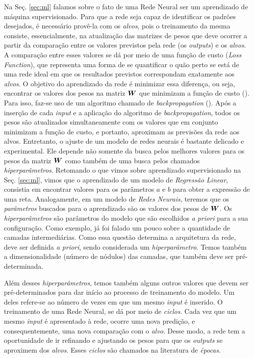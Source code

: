 Na Seç. \ref{sec:ml} falamos sobre o fato de uma Rede Neural ser um aprendizado de máquina supervisionado. Para que a rede seja capaz de identificar os padrões desejados, é necessário provê-la com os \textit{alvos}, pois o treinamento da mesma consiste, essencialmente, na atualização das matrizes de pesos que deve ocorrer a partir da comparação entre os valores previstos pela rede (os \textit{outputs}) e os \textit{alvos}. A comparação entre esses valores se dá por meio de uma função de custo (\textit{Loss Function}), que representa uma forma de se quantificar o quão perto se está de uma rede ideal em que os resultados previstos correspondam exatamente aos \textit{alvos}. O objetivo do aprendizado da rede é minimizar essa diferença, ou seja, encontrar os valores dos pesos na matriz $\bm{W}$ que minimizam a função de custo (\cite{josh:2017}). Para isso, faz-se uso de um algoritmo chamado de \textit{backpropagation} (\cite{Goodfellow-et-al-2016}). Após a inserção de cada \textit{input} e a aplicação do algoritmo de \textit{backpropagation}, todos os pesos são atualizados simultaneamente com os valores que em conjunto minimizam a função de custo, e portanto, aproximam as previsões da rede aos alvos. Entretanto, o ajuste de um modelo de redes neurais é bastante delicado e experimental. Ele depende não somente da busca pelos melhores valores para os pesos da matriz $\bm{W}$ como também de uma busca pelos chamados \textit{hiperparâmetros}. Retomando o que vimos sobre aprendizado supervisionado na Seç. \ref{sec:ml}, vimos que o aprendizado de um modelo de \textit{Regressão Linear}, consistia em encontrar valores para os parâmetros $a$ e $b$ para obter a expressão de uma reta. Analogamente, em um modelo de \textit{Redes Neurais}, teremos que os \textit{parâmetros} buscados para o aprendizado são os valores dos pesos de $\bm{W}$. Os \textit{hiperparâmetros} são parâmetros do modelo que são escolhidos \textit{a priori} para a sua configuração. Como exemplo, já foi falado um pouco sobre a quantidade de camadas intermediárias. Como essa questão determina a arquitetura da rede, deve ser definida \textit{a priori}, sendo considerada um \textit{hiperparâmetro}. Temos também a dimensionalidade (número de nódulos) das camadas, que também deve ser pré-determinada.

Além desses \textit{hiperparâmetros}, temos também alguns outros valores que devem ser pré-determinados para dar início ao processo de treinamento do modelo. Um deles refere-se ao número de vezes em que um mesmo \textit{input} é inserido. O treinamento de uma Rede Neural, se dá por meio de \textit{ciclos}. Cada vez que um mesmo \textit{input} é apresentado à rede, ocorre uma nova predição, e consequentemente, uma nova comparação com o \textit{alvo}. Desse modo, a rede tem a oportunidade de ir refinando e ajustando os pesos para que os \textit{outputs} se aproximem dos \textit{alvos}. Esses \textit{ciclos} são chamados na literatura de \textit{épocas}.

